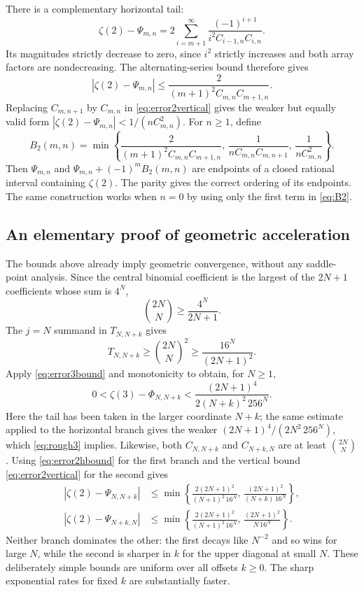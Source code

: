 \documentclass[11pt,letterpaper]{article}
\numberwithin{equation}{section}
\theoremstyle{definition}
\newcommand{\zthree}{\zeta(3)}
\newcommand{\ztwo}{\zeta(2)}
\begin{document}
There is a complementary horizontal tail:
\begin{equation}\label{eq:error2horizontal}
 \ztwo-\Psi_{m,n}
 =2\sum_{i=m+1}^{\infty}
 \frac{(-1)^{i+1}}{i^2C_{i-1,n}C_{i,n}}.
\end{equation}
Its magnitudes strictly decrease to zero, since $i^2$ strictly increases
and both array factors are nondecreasing. The alternating-series bound
therefore gives
\begin{equation}\label{eq:error2hbound}
 |\ztwo-\Psi_{m,n}|
 \leq\frac2{(m+1)^2C_{m,n}C_{m+1,n}}.
\end{equation}
Replacing $C_{m,n+1}$ by $C_{m,n}$ in \eqref{eq:error2vertical} gives the
weaker but equally valid form $|\ztwo-\Psi_{m,n}|<1/(nC_{m,n}^2)$.
For $n\geq1$, define
\begin{equation}\label{eq:B2}
 B_2(m,n)=\min\left\{
 \frac2{(m+1)^2C_{m,n}C_{m+1,n}},\,
 \frac1{nC_{m,n}C_{m,n+1}},\,
 \frac1{nC_{m,n}^2}\right\}.
\end{equation}
Then $\Psi_{m,n}$ and $\Psi_{m,n}+(-1)^m B_2(m,n)$ are endpoints of a
closed rational interval containing $\ztwo$. The parity gives the
correct ordering of its endpoints. The same construction works when
$n=0$ by using only the first term in \eqref{eq:B2}.

\subsection{An elementary proof of geometric acceleration}

The bounds above already imply geometric convergence, without any
saddle-point analysis. Since the central binomial coefficient is the
largest of the $2N+1$ coefficients whose sum is $4^N$,
\[
 \binom{2N}{N}\geq\frac{4^N}{2N+1}.
\]
The $j=N$ summand in $T_{N,N+k}$ gives
\[
 T_{N,N+k}\geq\binom{2N}{N}^2\geq\frac{16^N}{(2N+1)^2}.
\]
Apply \eqref{eq:error3bound} and monotonicity to obtain, for $N\geq1$,
\begin{equation}\label{eq:rough3}
 0<\zthree-\Phi_{N,N+k}
 <\frac{(2N+1)^4}{2(N+k)^2\,256^N}.
\end{equation}
Here the tail has been taken in the larger coordinate $N+k$; the same
estimate applied to the horizontal branch gives the weaker
$(2N+1)^4/(2N^2\,256^N)$, which \eqref{eq:rough3} implies.
Likewise, both $C_{N,N+k}$ and $C_{N+k,N}$ are at least
$\binom{2N}{N}$. Using \eqref{eq:error2hbound} for the first branch and
the vertical bound \eqref{eq:error2vertical} for the second gives
\begin{align}
 |\ztwo-\Psi_{N,N+k}|
 &\leq\min\left\{\frac{2(2N+1)^2}{(N+1)^2\,16^N},\,
 \frac{(2N+1)^2}{(N+k)\,16^N}\right\},\label{eq:rough2upper}\\
 |\ztwo-\Psi_{N+k,N}|
 &\leq\min\left\{\frac{2(2N+1)^2}{(N+1)^2\,16^N},\,
 \frac{(2N+1)^2}{N\,16^N}\right\}.\label{eq:rough2lower}
\end{align}
Neither branch dominates the other: the first decays like $N^{-2}$ and
so wins for large $N$, while the second is sharper in $k$ for the upper
diagonal at small $N$. These deliberately simple bounds are uniform over
all offsets $k\geq0$. The sharp exponential rates for fixed $k$ are
substantially faster.
\end{document}
